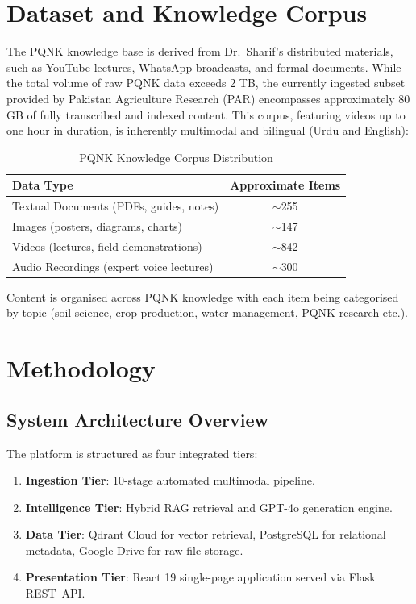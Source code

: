 \documentclass[conference]{IEEEtran}
\begin{document}
\section{Dataset and Knowledge Corpus}

The PQNK knowledge base is derived from Dr.~Sharif's distributed materials, such as YouTube lectures, WhatsApp broadcasts, and formal documents. While the total volume of raw PQNK data exceeds 2 TB, the currently ingested subset provided by Pakistan Agriculture Research (PAR) encompasses approximately 80 GB of fully transcribed and indexed content. This corpus, featuring videos up to one hour in duration, is inherently multimodal and bilingual (Urdu and English):

\begin{table}[h!]
\centering
\caption{PQNK Knowledge Corpus Distribution}
\label{tab:dataset}
\begin{tabular}{lc}
\toprule
\textbf{Data Type} & \textbf{Approximate Items} \\
\midrule
Textual Documents (PDFs, guides, notes) & $\sim$255 \\
Images (posters, diagrams, charts)      & $\sim$147 \\
Videos (lectures, field demonstrations) & $\sim$842 \\
Audio Recordings (expert voice lectures) & $\sim$300 \\
\bottomrule
\end{tabular}
\end{table}

Content is organised across PQNK knowledge with each item being categorised by topic (soil science, crop production,
water management, PQNK research etc.).

\section{Methodology}

\subsection{System Architecture Overview}

The platform is structured as four integrated tiers:
\begin{enumerate}[noitemsep, leftmargin=*]
  \item \textbf{Ingestion Tier}: 10-stage automated multimodal pipeline.
  \item \textbf{Intelligence Tier}: Hybrid RAG retrieval and GPT-4o generation engine.
  \item \textbf{Data Tier}: Qdrant Cloud for vector retrieval, PostgreSQL for relational
        metadata, Google Drive for raw file storage.
  \item \textbf{Presentation Tier}: React 19 single-page application served via Flask REST~API.
\end{enumerate}
\end{document}
